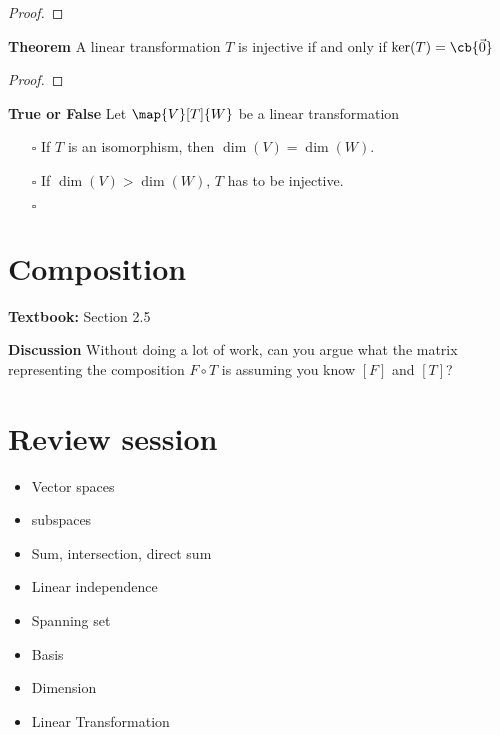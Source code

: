 \documentclass[letterpaper, 10pt]{article}
\begin{document}
\begin{proof}
\end{proof}


\vspace{300pt}
\lb
\textbf{Theorem}
\lb
A linear transformation $T$ is injective if and only if $\ker(T) = \cb{\vec 0}$
\begin{proof}
\end{proof}



\newpage
\lb
\textbf{True or False} 
Let $\map{V}[T]{W}$ be a linear transformation
\begin{enumerate}
    \item[$\square$]
        If $T$ is an isomorphism, then $\dim(V) = \dim(W)$.
    \item[$\square$]
        If $\dim(V) > \dim(W)$, $T$ has to be injective.
    \item[$\square$]
\end{enumerate}







\newpage
\section*{Composition}%
\textbf{Textbook:} Section 2.5



\lb
\textbf{Discussion}
\lb
Without doing a lot of work, can you argue what the matrix
representing the composition $F \circ T$ is assuming you know $[F]$ and $[T]$?








\newpage
\section*{Review session}%
\begin{itemize}
    \item Vector spaces
    \item subspaces
    \item Sum, intersection, direct sum
    \item Linear independence
    \item Spanning set
    \item Basis
    \item Dimension
    \item Linear Transformation
\end{itemize}
\end{document}
